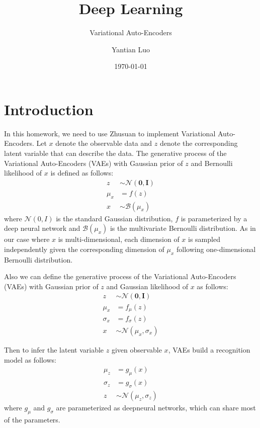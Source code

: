 \documentclass{elegantbook}
\title{Deep Learning}
\subtitle{Variational Auto-Encoders}
\author{Yantian Luo}
\institute{Electronic Engineering}
\date{\today}
\begin{document}
\maketitle
\tableofcontents
\mainmatter
\hypersetup{pageanchor=true}
\chapter{Introduction}
In this homework, we need to use Zhusuan to implement Variational Auto-Encoders. Let $x$ denote the observable data and $z$ denote the corresponding latent variable that can describe the data. The generative process of the Variational Auto-Encoders (VAEs) with Gaussian prior of $z$ and Bernoulli likelihood of $x$ is defined as follows:
\begin{equation}
\begin{aligned} z & \sim \mathcal{N}(\mathbf{0}, \mathbf{I}) \\ \mu_{x} &=f(z) \\ x & \sim \mathcal{B}\left(\mu_{x}\right) \end{aligned}
\end{equation}
where $\mathcal{N} (0, I)$ is the standard Gaussian distribution, $f$ is parameterized by a deep neural network and $\mathcal{B}(\mu_x )$ is the multivariate Bernoulli distribution. As in our case where $x$ is multi-dimensional, each dimension of $x$ is sampled independently given the corresponding dimension of $\mu_x$ following one-dimensional Bernoulli distribution.

Also we can define the generative process of the Variational Auto-Encoders (VAEs) with Gaussian prior of $z$ and Gaussian likelihood of $x$ as follows:
\begin{equation}
\begin{aligned} z & \sim \mathcal{N}(\mathbf{0}, \mathbf{I}) \\ \mu_{x} &=f_{\mu}(z) \\ \sigma_{x} &=f_{\sigma}(z) \\ x & \sim \mathcal{N}\left(\mu_{x}, \sigma_{x}\right) \end{aligned}
\end{equation}

Then to infer the latent variable $z$ given observable $x$, VAEs build a recognition model as follows:
\begin{equation}
\begin{aligned} \mu_{z} &=g_{\mu}(x) \\ \sigma_{z} &=g_{\sigma}(x) \\ z & \sim \mathcal{N}\left(\mu_{z}, \sigma_{z}\right) \end{aligned}
\end{equation}
where $g_\mu$ and $g_\sigma$ are parameterized as deepneural networks, which can share most of the parameters.
\end{document}
